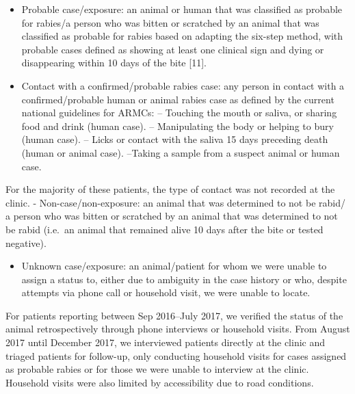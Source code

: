 \documentclass[
  oneside]{book}
\providecommand{\tightlist}{%
  \setlength{\itemsep}{0pt}\setlength{\parskip}{0pt}}
\begin{document}
\begin{itemize}
\item
  Probable case/exposure: an animal or human that was classified as probable for rabies/a person who was bitten or scratched by an animal that was classified as probable for rabies based on adapting the six-step method, with probable cases defined as showing at least one clinical sign and dying or disappearing within 10 days of the bite {[}11{]}.
\item
  Contact with a confirmed/probable rabies case: any person in contact with a confirmed/probable human or animal rabies case as defined by the current national guidelines for ARMCs: -- Touching the mouth or saliva, or sharing food and drink (human case). -- Manipulating the body or helping to bury (human case). -- Licks or contact with the saliva 15 days preceding death (human or animal case). --Taking a sample from a suspect animal or human case.
\end{itemize}

For the majority of these patients, the type of contact was not recorded at the clinic. - Non-case/non-exposure: an animal that was determined to not be rabid/ a person who was bitten or scratched by an animal that was determined to not be rabid (i.e.~an animal that remained alive 10 days after the bite or tested negative).

\begin{itemize}
\tightlist
\item
  Unknown case/exposure: an animal/patient for whom we were unable to assign a status to, either due to ambiguity in the case history or who, despite attempts via phone call or household visit, we were unable to locate.
\end{itemize}

For patients reporting between Sep 2016--July 2017, we verified the status of the animal retrospectively through phone interviews or household visits. From August 2017 until December 2017, we interviewed patients directly at the clinic and triaged patients for follow-up, only conducting household visits for cases assigned as probable rabies or for those we were unable to interview at the clinic. Household visits were also limited by accessibility due to road conditions.
\end{document}
